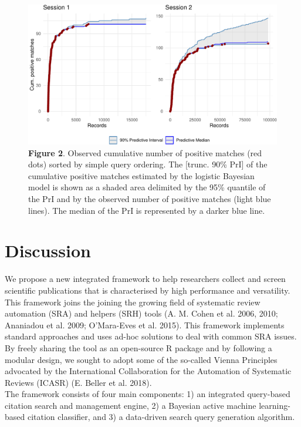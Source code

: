 \documentclass{article}
\begin{document}
\begin{figure}
\centering
\includegraphics{Manuscript_files/figure-latex/performance_plot-1.pdf}
\caption{\textbf{Figure 2}. Observed cumulative number of positive
matches (red dots) sorted by simple query ordering. The {[}trunc. 90\%
PrI{]} of the cumulative positive matches estimated by the logistic
Bayesian model is shown as a shaded area delimited by the 95\% quantile
of the PrI and by the observed number of positive matches (light blue
lines). The median of the PrI is represented by a darker blue line.}
\end{figure}

\hypertarget{discussion}{%
\section{Discussion}\label{discussion}}

We propose a new integrated framework to help researchers collect and
screen scientific publications that is characterised by high performance
and versatility. This framework joins the joining the growing field of
systematic review automation (SRA) and helpers (SRH) tools (A. M. Cohen
et al. 2006, 2010; Ananiadou et al. 2009; O'Mara-Eves et al. 2015). This
framework implements standard approaches and uses ad-hoc solutions to
deal with common SRA issues. By freely sharing the tool as an
open-source R package and by following a modular design, we sought to
adopt some of the so-called Vienna Principles advocated by the
International Collaboration for the Automation of Systematic Reviews
(ICASR) (E. Beller et al. 2018).\\
The framework consists of four main components: 1) an integrated
query-based citation search and management engine, 2) a Bayesian active
machine learning-based citation classifier, and 3) a data-driven search
query generation algorithm.\\
\end{document}
